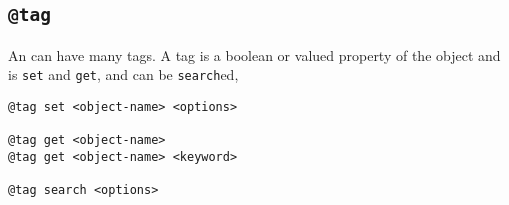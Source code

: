 \subsection{\texttt{@tag}}\label{tag}

An  can have many tags. A tag is a boolean or valued property of the object and is \texttt{set} and \texttt{get}, and can be \texttt{search}ed,
%
\begin{verbatim}
@tag set <object-name> <options>

@tag get <object-name>
@tag get <object-name> <keyword>

@tag search <options>
\end{verbatim}